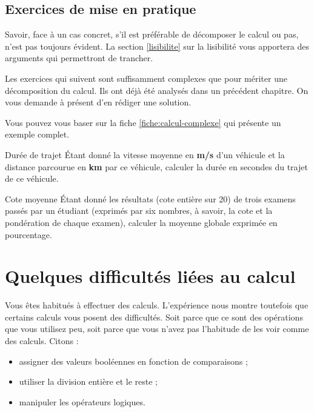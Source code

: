 		\subsection{Exercices de mise en pratique}
		
			Savoir, face à un cas concret, s'il est préférable 
			de décomposer le calcul ou pas, n'est pas toujours évident.	
			La section \vref{lisibilite}
			sur la lisibilité vous apportera des arguments
			qui permettront de trancher.
	
			Les exercices qui suivent sont suffisamment complexes
			que pour mériter une décomposition du calcul.
			Ils ont déjà été analysés dans un précédent chapitre.
			On vous demande à présent d'en rédiger une solution.
	
			Vous pouvez vous baser sur la fiche \vref{fiche:calcul-complexe}
			qui présente un exemple complet.
			
			\begin{Exercice}{Durée de trajet}
				Étant donné la vitesse moyenne en \textbf{m/s}
				d’un véhicule et la distance parcourue en \textbf{km} par ce véhicule,
				calculer la durée en secondes du trajet de ce véhicule.
			\end{Exercice}
		
			\begin{Exercice}{Cote moyenne}
				Étant donné les résultats (cote entière sur
				20) de trois examens passés par un étudiant (exprimés par six nombres,
				à savoir, la cote et la pondération de chaque examen), calculer 
				la moyenne globale exprimée en pourcentage.
			\end{Exercice}
	
	\section{Quelques difficultés liées au calcul}
	
		Vous êtes habitués à effectuer des calculs.
		L'expérience nous montre toutefois que certains calculs
		vous posent des difficultés.
		Soit parce que ce sont des opérations que vous utilisez peu,
		soit parce que vous n'avez pas l'habitude de les voir comme des
		calculs.
		Citons : 
		\begin{itemize}
		\item
			assigner des valeurs booléennes 
			en fonction de comparaisons ;
		\item
			utiliser la division entière et le reste ;
		\item
			manipuler les opérateurs logiques.
		\end{itemize}
		
